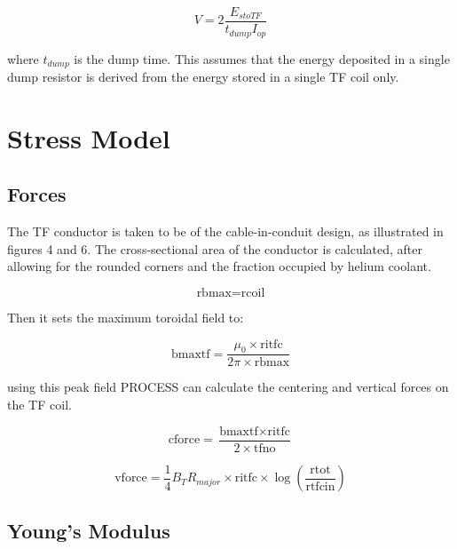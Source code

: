 \documentclass[hidelinks]{article}
\numberwithin{equation}{section}
\begin{document}
    \begin{equation}\label{eq: dump-voltage}
        V = 2 \frac{E_{stoTF}}{t_{dump}I_{op}}
    \end{equation}

    \noi where $t_{dump}$ is the dump time. This assumes that the energy deposited in 
    a single dump resistor is derived from the energy stored in a single TF coil only.

    \section{Stress Model}

    \subsection{Forces}

    \noi The TF conductor is taken to be of the cable-in-conduit design, as 
    illustrated in figures 4 and 6.  The cross-sectional area of the conductor is 
    calculated, after allowing for the rounded corners and the fraction occupied by 
    helium coolant. 

    \begin{equation}\label{eq: rbmax}
    \text{rbmax} = \text{rcoil}
    \end{equation}

    \noi Then it sets the maximum toroidal field to:

    \begin{equation}\label{eq: bmaxtf}
    \text{bmaxtf} = \frac{\mu_0 \times \text{ritfc}}{2\pi \times \text{rbmax}}
    \end{equation}

    \noi using this peak field PROCESS can calculate the centering and vertical 
    forces on the TF coil. 

    \vspace{1.0cm}\begin{equation}\label{eq: cforce}
    \text{cforce} = \frac{\text{bmaxtf} \times \text{ritfc}}{2 \times \text{tfno}}
    \end{equation}

    \begin{equation}\label{eq: vforce}
    \text{vforce} = \frac{1}{4}B_TR_{major}\times \text{ritfc} \times 
    \log(\frac{\text{rtot}}{\text{rtfcin}})
    \end{equation}


    \subsection{Young's Modulus}
\end{document}
